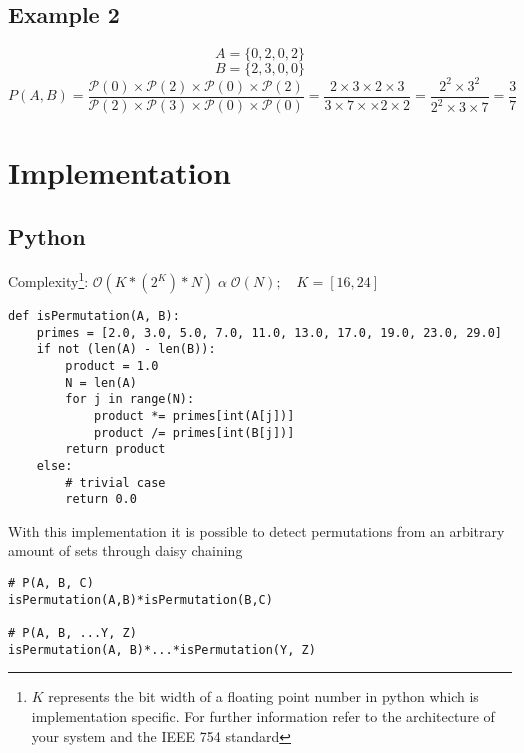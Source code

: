 \documentclass[]{article}
\begin{document}
\subsection*{Example 2}
\begin{equation}
A = \{0, 2, 0, 2\}
\end{equation}
\begin{equation}
B = \{2, 3, 0, 0\}
\end{equation}
\begin{equation}
P(A, B) = \frac{\mathcal{P}(0) \times \mathcal{P}(2) \times \mathcal{P}(0) \times \mathcal{P}(2)}{\mathcal{P}(2) \times \mathcal{P}(3) \times \mathcal{P}(0) \times \mathcal{P}(0)} = \frac{2 \times 3 \times 2 \times 3}{3 \times 7 \times \times 2 \times 2} = \frac{2^{2} \times 3^{2}}{2^{2} \times 3 \times 7} = \frac{3}{7}
\end{equation}
\pagebreak
\section*{Implementation}
\subsection*{Python}
Complexity\footnote{$K$ represents the bit width of a floating point number in python which is implementation specific. For further information refer to the architecture of your system and the IEEE 754 standard}: $\mathcal{O}(K*(2^{K})*N) \;  \alpha \; \mathcal{O}(N);\quad K=[16, 24]$
\begin{lstlisting}
def isPermutation(A, B):
	primes = [2.0, 3.0, 5.0, 7.0, 11.0, 13.0, 17.0, 19.0, 23.0, 29.0]
	if not (len(A) - len(B)):
		product = 1.0
		N = len(A)
		for j in range(N):
			product *= primes[int(A[j])]
			product /= primes[int(B[j])]
		return product
	else:
		# trivial case
		return 0.0
\end{lstlisting}
With this implementation it is possible to detect permutations from an arbitrary amount of sets through daisy chaining
\begin{lstlisting}[frame=single]
# P(A, B, C)
isPermutation(A,B)*isPermutation(B,C)

# P(A, B, ...Y, Z)
isPermutation(A, B)*...*isPermutation(Y, Z)
\end{lstlisting}
\end{document}
